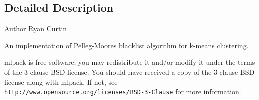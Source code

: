 \subsection{Detailed Description}
\begin{DoxyAuthor}{Author}
Ryan Curtin
\end{DoxyAuthor}
An implementation of Pelleg-\/\+Moore\textquotesingle{}s \textquotesingle{}blacklist\textquotesingle{} algorithm for k-\/means clustering.

mlpack is free software; you may redistribute it and/or modify it under the terms of the 3-\/clause B\+SD license. You should have received a copy of the 3-\/clause B\+SD license along with mlpack. If not, see {\tt http\+://www.\+opensource.\+org/licenses/\+B\+S\+D-\/3-\/\+Clause} for more information. 